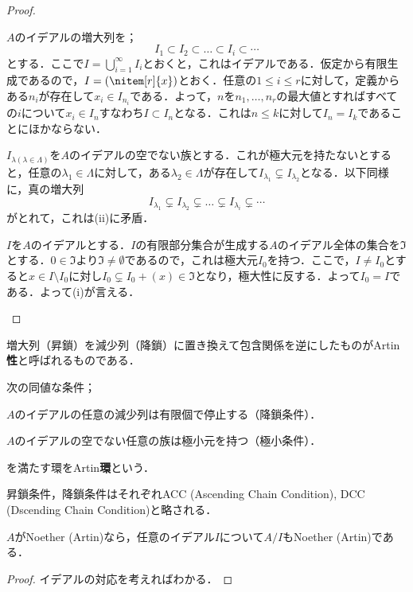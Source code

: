 \begin{proof}
	\begin{eqv}[3]
		\item 
		$A$のイデアルの増大列を；
		\[I_1\subset I_2\subset\dots\subset I_i\subset\cdots\]
		とする．ここで$I=\bigcup_{i=1}^\infty I_i$とおくと，これはイデアルである．仮定から有限生成であるので，$I=(\nitem[r]{x})$とおく．任意の$1\leq i\leq r$に対して，定義からある$n_i$が存在して$x_i\in I_{n_i}$である．よって，$n$を$n_1,\dots,n_r$の最大値とすればすべての$i$について$x_i\in I_n$すなわち$I\subset I_{n}$となる．これは$n\leq k$に対して$I_{n}=I_k$であることにほかならない．
		\item
		$I_{\lambda(\lambda\in\Lambda)}$を$A$のイデアルの空でない族とする．これが極大元を持たないとすると，任意の$\lambda_1\in\Lambda$に対して，ある$\lambda_2\in\Lambda$が存在して$I_{\lambda_1}\subsetneq I_{\lambda_2}$となる．以下同様に，真の増大列
		\[I_{\lambda_1}\subsetneq I_{\lambda_2}\subsetneq\dots\subsetneq I_{\lambda_i}\subsetneq\cdots\]
		がとれて，これは(ii)に矛盾．
		\item 
		$I$を$A$のイデアルとする．$I$の有限部分集合が生成する$A$のイデアル全体の集合を$\Im$とする．$0\in\Im$より$\Im\neq\emptyset$であるので，これは極大元$I_0$を持つ．ここで，$I\neq I_0$とすると$x\in I\setminus I_0$に対し$I_0\subsetneq I_0+(x)\in\Im$となり，極大性に反する．よって$I_0=I$である．よって(i)が言える．
	\end{eqv}
\end{proof}

増大列（昇鎖）を減少列（降鎖）に置き換えて包含関係を逆にしたものがArtin\textbf{性}と呼ばれるものである．

\begin{defi}[Artin環]
	次の同値な条件；
	\begin{sakura}
		\item  $A$のイデアルの任意の減少列は有限個で停止する（降鎖条件）．
		\item $A$のイデアルの空でない任意の族は極小元を持つ（極小条件）．
	\end{sakura}
	を満たす環をArtin\textbf{環}という．
\end{defi}

昇鎖条件，降鎖条件はそれぞれACC (Ascending Chain Condition), DCC (Dscending Chain Condition)と略される．

\begin{prop}
	$A$がNoether (Artin)なら，任意のイデアル$I$について$A/I$もNoether (Artin)である．
\end{prop}
\begin{proof}
	イデアルの対応を考えればわかる．
\end{proof}

